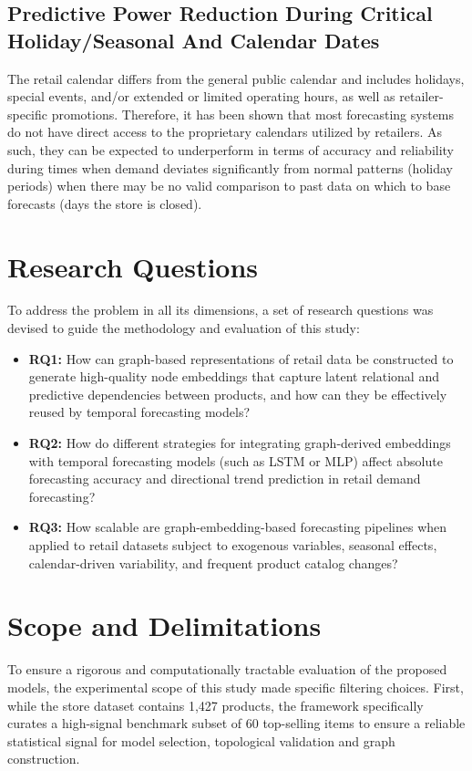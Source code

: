 \subsection{Predictive Power Reduction During Critical Holiday/Seasonal And Calendar Dates}
The retail calendar differs from the general public calendar and includes holidays, special events, and/or extended or limited operating hours, as well as retailer-specific promotions. Therefore, it has been shown that most forecasting systems do not have direct access to the proprietary calendars utilized by retailers. As such, they can be expected to underperform in terms of accuracy and reliability during times when demand deviates significantly from normal patterns (holiday periods) when there may be no valid comparison to past data on which to base forecasts (days the store is closed).


\section{Research Questions} \label{sec:research_questions}

To address the problem in all its dimensions, a set of research questions was devised to guide the methodology and evaluation of this study:

\begin{itemize}
    \item \textbf{RQ1:} How can graph-based representations of retail data be constructed to generate high-quality node embeddings that capture latent relational and predictive dependencies between products, and how can they be effectively reused by temporal forecasting models?
    \item \textbf{RQ2:} How do different strategies for integrating graph-derived embeddings with temporal forecasting models (such as \ac{LSTM} or \ac{MLP}) affect absolute forecasting accuracy and directional trend prediction in retail demand forecasting?
    \item \textbf{RQ3:} How scalable are graph-embedding-based forecasting pipelines when applied to retail datasets subject to exogenous variables, seasonal effects, calendar-driven variability, and frequent product catalog changes?
\end{itemize}

\section{Scope and Delimitations} \label{sec:scope}
To ensure a rigorous and computationally tractable evaluation of the proposed models, the experimental scope of this study made specific filtering choices. First, while the store dataset contains 1,427 products, the framework specifically curates a high-signal benchmark subset of 60 top-selling items to ensure a reliable statistical signal for model selection, topological validation and graph construction.

